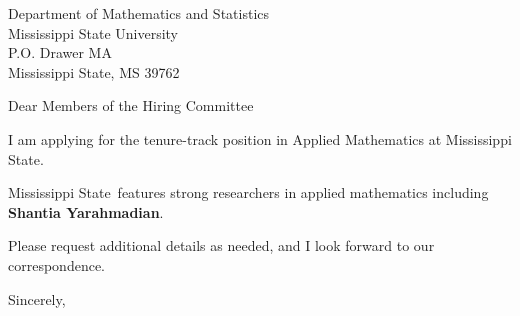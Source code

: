 




	
	
	\def\School{Mississippi State}
	
	\begin{letter}
		{Department of Mathematics and Statistics\\
			Mississippi State University\\
			P.O. Drawer MA\\
			Mississippi State, MS 39762
		}
		
		\opening{Dear Members of the Hiring Committee}
		
		
		I am applying for the tenure-track position in Applied Mathematics at \School. 
		
		\School~features strong researchers in applied mathematics including \textbf{Shantia Yarahmadian}. 
		
		
		
		
		
		Please request additional details as needed, and I look forward to our correspondence.
		
		\closing{Sincerely,}
	\end{letter}
